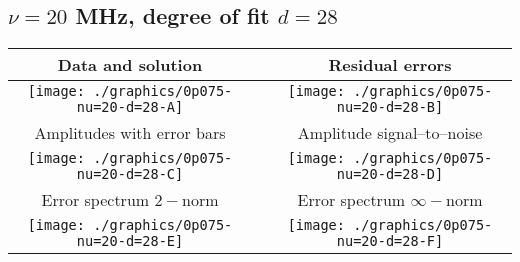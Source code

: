 

% 

\clearpage{}
\break{}

\subsection{$\nu = 20$ MHz, degree of fit $d = 28$}

\begin{table}[h]
    \begin{center}
        \begin{tabular}{ccc}
            Data and solution & \quad & Residual errors \\\hline
            \texttt{[image: ./graphics/0p075-nu=20-d=28-A]} &&
            \texttt{[image: ./graphics/0p075-nu=20-d=28-B]} \\[15pt]
            Amplitudes with error bars && Amplitude signal--to--noise \\\hline
            \texttt{[image: ./graphics/0p075-nu=20-d=28-C]} &&
            \texttt{[image: ./graphics/0p075-nu=20-d=28-D]} \\[15pt]
            Error spectrum $2-$norm && Error spectrum $\infty-$norm \\\hline
            \texttt{[image: ./graphics/0p075-nu=20-d=28-E]} &&
            \texttt{[image: ./graphics/0p075-nu=20-d=28-F]} \\[15pt]
        \end{tabular}
    \end{center}
\label{fig:elev=75, nu=20}
\end{table}



\endinput
